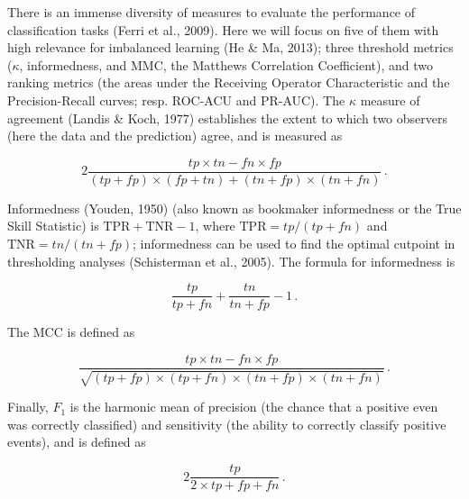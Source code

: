 \documentclass[11pt]{article}
\begin{document}
There is an immense diversity of measures to evaluate the performance of
classification tasks (Ferri et al., 2009). Here we will focus on five of
them with high relevance for imbalanced learning (He \& Ma, 2013); three
threshold metrics (\(\kappa\), informedness, and MMC, the Matthews
Correlation Coefficient), and two ranking metrics (the areas under the
Receiving Operator Characteristic and the Precision-Recall curves; resp.
ROC-ACU and PR-AUC). The \(\kappa\) measure of agreement (Landis \&
Koch, 1977) establishes the extent to which two observers (here the data
and the prediction) agree, and is measured as

\[
2\frac{tp\times tn - fn\times fp}{(tp+fp)\times (fp+tn)+(tn+fp)\times (tn+fn)} \,.
\]

Informedness (Youden, 1950) (also known as bookmaker informedness or the
True Skill Statistic) is \(\text{TPR}+\text{TNR}-1\), where
\(\text{TPR}= tp/(tp+fn)\) and \(\text{TNR} = tn/(tn+fp)\); informedness
can be used to find the optimal cutpoint in thresholding analyses
(Schisterman et al., 2005). The formula for informedness is

\[\frac{tp}{tp+fn}+\frac{tn}{tn+fp}-1\,.\]

The MCC is defined as

\[
\frac{tp\times tn - fn\times fp}{\sqrt{(tp+fp)\times (tp+fn)\times (tn+fp)\times (tn+fn)}} \,.
\]

Finally, \(F_1\) is the harmonic mean of precision (the chance that a
positive even was correctly classified) and sensitivity (the ability to
correctly classify positive events), and is defined as

\[
2\frac{tp}{2\times tp + fp + fn}\,.
\]
\end{document}
